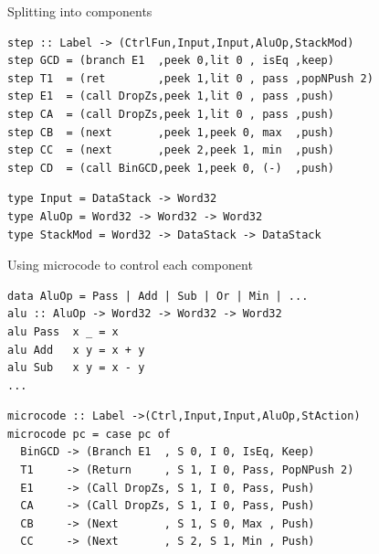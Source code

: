 \documentclass[pdf]{beamer}
\begin{document}
\begin{frame}[fragile]{Splitting into components}

\begin{block}{}
\begin{verbatim}
step :: Label -> (CtrlFun,Input,Input,AluOp,StackMod)
step GCD = (branch E1  ,peek 0,lit 0 , isEq ,keep)
step T1  = (ret        ,peek 1,lit 0 , pass ,popNPush 2)
step E1  = (call DropZs,peek 1,lit 0 , pass ,push)
step CA  = (call DropZs,peek 1,lit 0 , pass ,push)
step CB  = (next       ,peek 1,peek 0, max  ,push)
step CC  = (next       ,peek 2,peek 1, min  ,push)
step CD  = (call BinGCD,peek 1,peek 0, (-)  ,push)
\end{verbatim}
\end{block}

\begin{block}{}
\begin{verbatim}type Input = DataStack -> Word32
type AluOp = Word32 -> Word32 -> Word32
type StackMod = Word32 -> DataStack -> DataStack
\end{verbatim}
\end{block}
\end{frame}

\begin{frame}[fragile]{Using microcode to control each component}

\begin{block}{}
\begin{verbatim}
data AluOp = Pass | Add | Sub | Or | Min | ...
alu :: AluOp -> Word32 -> Word32 -> Word32
alu Pass  x _ = x
alu Add   x y = x + y
alu Sub   x y = x - y
...
\end{verbatim}
\end{block}
\pause
\begin{block}{}
\begin{verbatim}
microcode :: Label ->(Ctrl,Input,Input,AluOp,StAction)
microcode pc = case pc of
  BinGCD -> (Branch E1  , S 0, I 0, IsEq, Keep)
  T1     -> (Return     , S 1, I 0, Pass, PopNPush 2)
  E1     -> (Call DropZs, S 1, I 0, Pass, Push)
  CA     -> (Call DropZs, S 1, I 0, Pass, Push)
  CB     -> (Next       , S 1, S 0, Max , Push)
  CC     -> (Next       , S 2, S 1, Min , Push)
\end{verbatim}
\end{block}


\end{frame}
\end{document}
